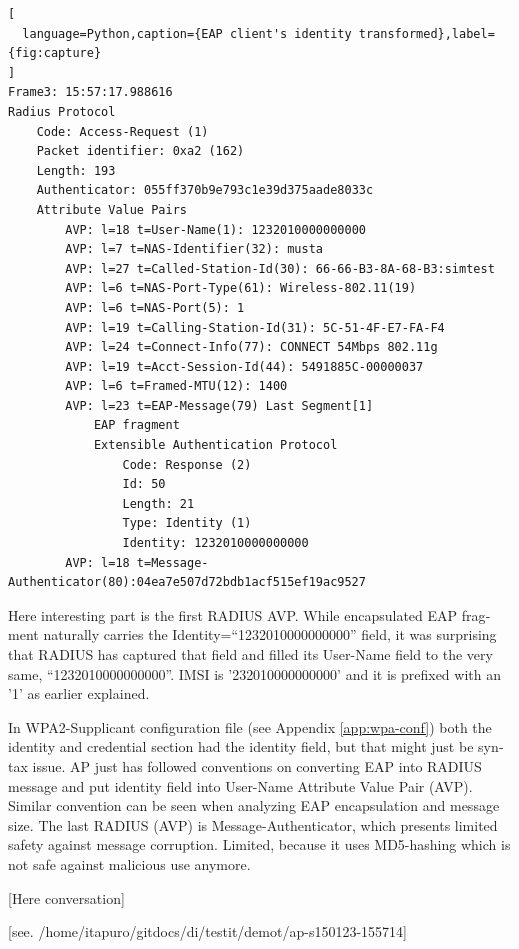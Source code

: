 \documentclass[12pt,a4paper,english]{tutthesis}
\begin{document}
\begin{otherlanguage}{english}
\renewcommand{\lstlistingname}{Capture}

\begin{lstlisting}[
  language=Python,caption={EAP client's identity transformed},label={fig:capture}
]
Frame3: 15:57:17.988616
Radius Protocol
    Code: Access-Request (1)
    Packet identifier: 0xa2 (162)
    Length: 193
    Authenticator: 055ff370b9e793c1e39d375aade8033c
    Attribute Value Pairs
        AVP: l=18 t=User-Name(1): 1232010000000000
        AVP: l=7 t=NAS-Identifier(32): musta
        AVP: l=27 t=Called-Station-Id(30): 66-66-B3-8A-68-B3:simtest
        AVP: l=6 t=NAS-Port-Type(61): Wireless-802.11(19)
        AVP: l=6 t=NAS-Port(5): 1
        AVP: l=19 t=Calling-Station-Id(31): 5C-51-4F-E7-FA-F4
        AVP: l=24 t=Connect-Info(77): CONNECT 54Mbps 802.11g
        AVP: l=19 t=Acct-Session-Id(44): 5491885C-00000037
        AVP: l=6 t=Framed-MTU(12): 1400
        AVP: l=23 t=EAP-Message(79) Last Segment[1]
            EAP fragment
            Extensible Authentication Protocol
                Code: Response (2)
                Id: 50
                Length: 21
                Type: Identity (1)
                Identity: 1232010000000000
        AVP: l=18 t=Message-Authenticator(80):04ea7e507d72bdb1acf515ef19ac9527
\end{lstlisting}
\normalsize


Here interesting part is the first RADIUS AVP.
While encapsulated EAP fragment naturally carries the Identity=``1232010000000000''
field, it was surprising that RADIUS has captured that field and 
filled its User-Name field to the very same, ``1232010000000000''. 
IMSI is '232010000000000' and it is prefixed with
an '1' as earlier explained.

In WPA2-Supplicant configuration file (see Appendix \ref{app:wpa-conf}) both the identity and
credential section had the identity field, but that might 
just be syntax issue.
AP just has followed conventions on converting
EAP into RADIUS message and put identity field into User-Name
Attribute Value Pair (AVP).
Similar convention can be seen when analyzing EAP encapsulation and
message size. The last RADIUS (AVP) is 
Message-Authenticator, which presents limited safety against message 
corruption. Limited, because it uses MD5-hashing which is not safe
against malicious use anymore.

[Here conversation]



[see. /home/itapuro/gitdocs/di/testit/demot/ap-s150123-155714]


\end{otherlanguage}
\end{document}
